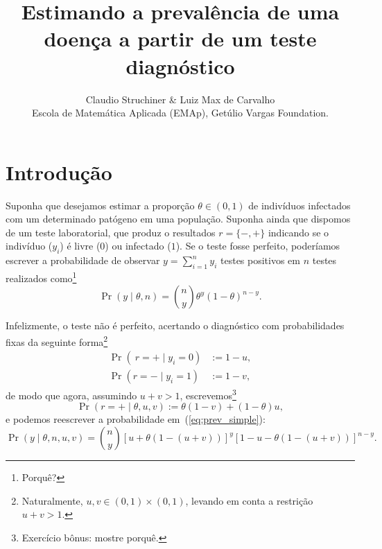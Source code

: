 \documentclass[a4paper, notitlepage, 10pt]{article}
\title{\vspace{-9ex}\centering \bf Estimando a prevalência de uma doença a partir de um teste diagnóstico}
\author{
Claudio Struchiner \& Luiz Max de Carvalho \\
Escola de Matemática Aplicada (EMAp), Get\'ulio Vargas Foundation.
}
\begin{document}
\maketitle

% 


\section*{Introdução}

Suponha que desejamos estimar a proporção $\theta \in (0, 1)$ de indivíduos infectados com um determinado patógeno em uma população.
Suponha ainda que dispomos de um teste laboratorial, que produz o resultados $r = \{-, +\}$ indicando se o indivíduo ($y_i$) é livre ($0$) ou infectado ($1$).
Se o teste fosse perfeito, poderíamos escrever a probabilidade de observar $y = \sum_{i =1}^n y_i$ testes positivos em $n$ testes realizados como\footnote{Porquê?}
\begin{equation}
\label{eq:prev_simple}
 \operatorname{Pr}\left( y \mid \theta, n \right) = \binom{n}{y} \theta^y (1-\theta)^{n-y}. 
\end{equation}

Infelizmente, o teste não é perfeito, acertando o diagnóstico com probabilidades fixas da seguinte forma\footnote{Naturalmente, $u, v \in (0, 1) \times (0, 1)$, levando em conta a restrição $u + v > 1$.}
\begin{align}
 \operatorname{Pr}\left(\ r = + \mid y_i = 0 \right) &:= 1-u,\\
 \operatorname{Pr}\left( r = - \mid y_i = 1 \right) &:= 1-v,
\end{align}
de modo que agora, assumindo $u + v > 1$, escrevemos\footnote{Exercício bônus: mostre porquê.}
\begin{equation}
  \operatorname{Pr}\left(r = + \mid \theta, u, v \right) := \theta ( 1- v) + (1-\theta)u,
\end{equation}
e podemos reescrever a probabilidade em~(\ref{eq:prev_simple}):
\begin{equation}
 \operatorname{Pr}\left(y \mid \theta, n, u, v\right) = \binom{n}{y} \left[ u + \theta ( 1- (u  + v)) \right]^{y} \left[ 1 -u - \theta (1 -(u + v))\right]^{n-y}.
\end{equation}
\end{document}
